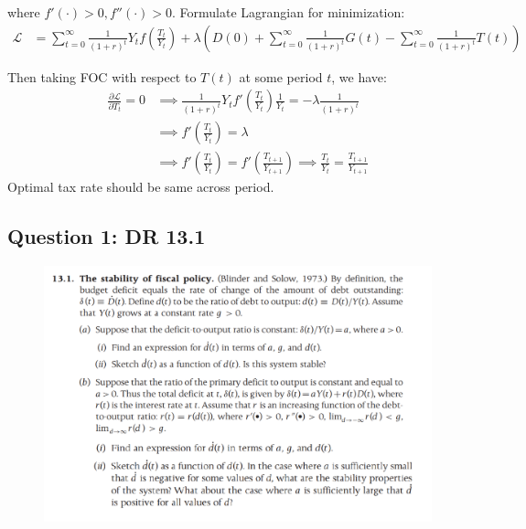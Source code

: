\documentclass{article}
\newcommand{\?}{\textcolor{red}{(?)}} %
\begin{document}
        where $f'(\cdot) > 0,  f''(\cdot) > 0$. Formulate Lagrangian for minimization:
        \begin{align}
            \mathcal{L}
            &= \sum_{t=0}^\infty
            \frac{1}{(1+r)^t}
            Y_t f\left(\frac{T_t}{Y_t}\right)
            + \lambda \left(
            D(0) + \sum_{t=0}^\infty \frac{1}{(1+r)^t} G(t)
            - \sum_{t=0}^\infty \frac{1}{(1+r)^t} T(t)
            \right)
        \end{align}
        
        Then taking FOC with respect to $T(t)$ at some period $t$, we have:
        \begin{align}
            \frac{\partial \mathcal{L}}{\partial T_t}
            = 0
            &\implies
            \frac{1}{(1+r)^t}
            Y_t f'\left(\frac{T_t}{Y_t}\right) \frac{1}{Y_t} = - \lambda \frac{1}{(1+r)^t}
            \\
            &\implies
            f'\left(\frac{T_t}{Y_t}\right)
            = \lambda
            \\
            &\implies
            f'\left(\frac{T_t}{Y_t}\right)
            = f'\left(\frac{T_{t+1}}{Y_{t+1}}\right)
            \implies
            \frac{T_t}{Y_t} = \frac{T_{t+1}}{Y_{t+1}}
        \end{align}
        Optimal tax rate should be same across period.
    
    \subsection{Question 1: DR 13.1}
    
        \begin{figure}[!ht]
            \centering
            \includegraphics[width=\textwidth]{Homework/HW7/HW7_DR13.1.png}
        \end{figure}
        
\end{document}
